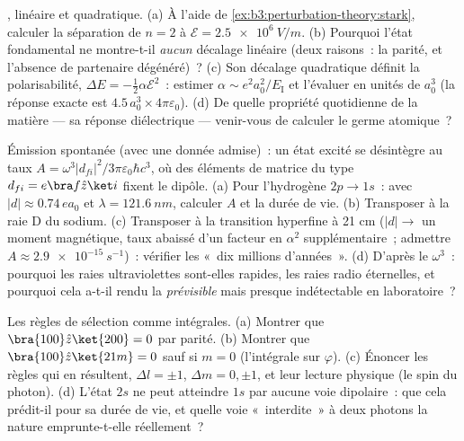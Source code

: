\begin{exercise}[$\star\star$]\label{exo:b3:perturbation-theory:7}
, linéaire et quadratique. (a) À l'aide de
\cref{ex:b3:perturbation-theory:stark}, calculer la séparation de
$n = 2$ à $\mathcal E = \qty{2.5e6}{V/m}$. (b) Pourquoi l'état
fondamental ne montre-t-il \emph{aucun} décalage linéaire (deux
raisons~: la parité, et l'absence de partenaire dégénéré)~? (c) Son
décalage quadratique définit la polarisabilité,
$\Delta E = -\tfrac12\alpha\mathcal E^2$~: estimer
$\alpha \sim e^2a_0^2/E_{\text{I}}$ et l'évaluer en unités de
$a_0^3$ (la réponse exacte est $4.5\,a_0^3 \times
4\pi\varepsilon_0$). (d) De quelle propriété quotidienne de la matière
--- sa réponse diélectrique --- venir-vous de calculer le germe
atomique~?
\end{exercise}

\begin{exercise}[$\star\star$]\label{exo:b3:perturbation-theory:8}
Émission spontanée (avec une donnée admise)~: un état excité se
désintègre au taux $A = \omega^3|d_{fi}|^2/3\pi\varepsilon_0\hbar c^3$,
où des éléments de matrice du type $d_{fi} = e\bra f\hat z\ket i$
fixent le dipôle. (a) Pour l'hydrogène $2p \to 1s$~: avec $|d| \approx 0.74\,
ea_0$ et $\lambda = \qty{121.6}{nm}$, calculer $A$ et la durée de vie.
(b) Transposer à la raie D du sodium. (c) Transposer à la transition
hyperfine à 21 cm ($|d| \to$ un moment magnétique, taux abaissé d'un
facteur en $\alpha^2$ supplémentaire~; admettre $A \approx
\qty{2.9e-15}{s^{-1}}$)~: vérifier les «~dix millions d'années~». (d)
D'après le $\omega^3$~: pourquoi les raies ultraviolettes sont-elles
rapides, les raies radio éternelles, et pourquoi cela a-t-il rendu la
 \emph{prévisible} mais presque indétectable en
laboratoire~?
\end{exercise}

\begin{exercise}[$\star\star$]\label{exo:b3:perturbation-theory:9}
Les règles de sélection comme intégrales. (a) Montrer que $\bra{100}\hat z\ket{200} =
0$ par parité. (b) Montrer que $\bra{100}\hat z\ket{21m} = 0$ sauf si $m =
0$ (l'intégrale sur $\varphi$). (c) Énoncer les règles qui en résultent, $\Delta
l = \pm1$, $\Delta m = 0, \pm1$, et leur lecture physique (le spin du
photon). (d) L'état $2s$ ne peut atteindre $1s$ par aucune voie
dipolaire~: que cela prédit-il pour sa durée de vie, et quelle voie
«~interdite~» à deux photons la nature emprunte-t-elle réellement~?
\end{exercise}

